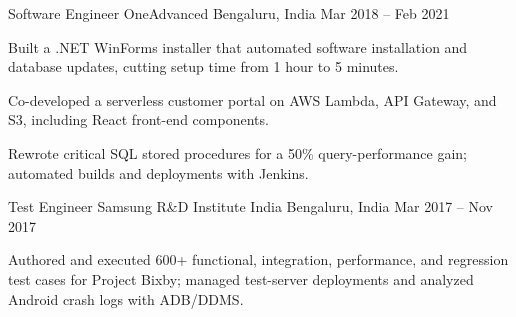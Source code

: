 \documentclass[11pt, a4paper]{awesome-cv}
\begin{document}
\begin{cventries}
  \cventry
    {Software Engineer}
    {OneAdvanced}
    {Bengaluru, India}
    {Mar 2018 -- Feb 2021}
    {
      \begin{cvitems}
        \item {Built a .NET WinForms installer that automated software installation and database updates, cutting setup time from 1 hour to 5 minutes.}
        \item {Co-developed a serverless customer portal on AWS Lambda, API Gateway, and S3, including React front-end components.}
        \item {Rewrote critical SQL stored procedures for a 50\% query-performance gain; automated builds and deployments with Jenkins.}
      \end{cvitems}
    }

  \cventry
    {Test Engineer}
    {Samsung R\&D Institute India}
    {Bengaluru, India}
    {Mar 2017 -- Nov 2017}
    {
      \begin{cvitems}
        \item {Authored and executed 600+ functional, integration, performance, and regression test cases for Project Bixby; managed test-server deployments and analyzed Android crash logs with ADB/DDMS.}
      \end{cvitems}
    }

\end{cventries}
\end{document}
